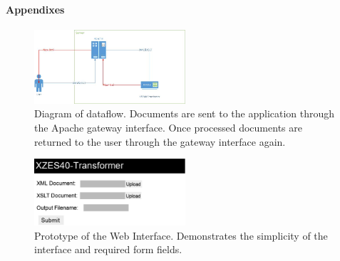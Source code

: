 \paragraph{Appendixes}

% 
% 
% 
% 
% 

\begin{figure}[hp]
  \centering
  \captionsetup{justification=centering,margin=2cm}
  \includegraphics[width=0.5\textwidth]{figures/document-flow-digram}
  \caption{
    Diagram of dataflow.
    Documents are sent to the application through the Apache gateway interface.
    Once processed documents are returned to the user through the gateway interface again.
  }
\end{figure}
        
\begin{figure}[hp]
  \centering
  \captionsetup{justification=centering,margin=2cm}
  \includegraphics[width=0.5\textwidth]{figures/website-raw}
  \caption{
    Prototype of the Web Interface.
    Demonstrates the simplicity of the interface and required form fields.
  }
\end{figure}

